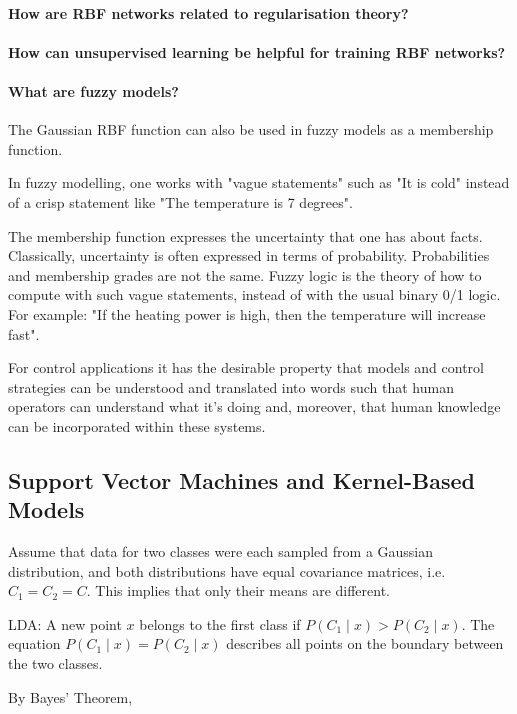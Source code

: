 \paragraph{How are RBF networks related to regularisation theory?}

\paragraph{How can unsupervised learning be helpful for training RBF networks?}

\paragraph{What are fuzzy models?}

The Gaussian RBF function can also be used in fuzzy models as a membership function.

In fuzzy modelling, one works with "vague statements" such as "It is cold"
instead of a crisp statement like "The temperature is 7 degrees".

The membership function expresses the uncertainty that one has about facts.
Classically, uncertainty is often expressed in terms of probability.
Probabilities and membership grades are not the same.
Fuzzy logic is the theory of how to compute with such vague statements, instead of with the usual binary 0/1 logic.
For example: "If the heating power is high, then the temperature will increase fast".

For control applications it has the desirable property that models and
control strategies can be understood and translated into words such that
human operators can understand what it's doing and, moreover, that
human knowledge can be incorporated within these systems.


\newpage
\subsection{Support Vector Machines and Kernel-Based Models}

Assume that data for two classes were each sampled from a Gaussian distribution,
and both distributions have equal covariance matrices, i.e. $C_1 = C_2 = C$.
This implies that only their means are different.

LDA: A new point $x$ belongs to the first class if $P(C_1 \mid x) > P(C_2 \mid x)$.
The equation $P(C_1 \mid x) = P(C_2 \mid x)$ describes all points on the boundary
between the two classes.

By Bayes' Theorem,

